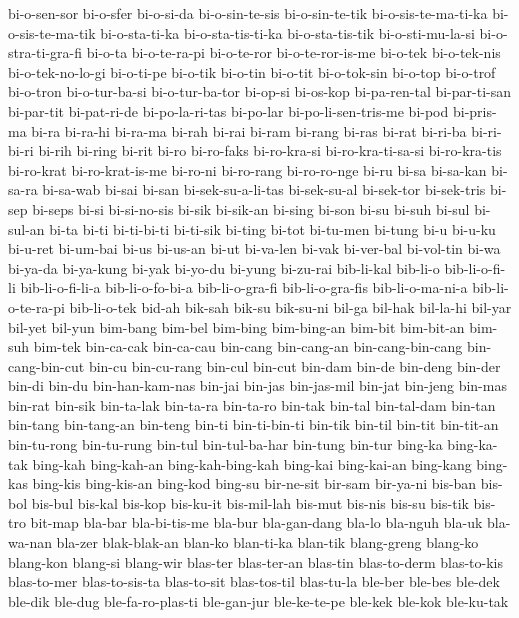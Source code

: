 {bi-o-sen-sor bi-o-sfer bi-o-si-da bi-o-sin-te-sis bi-o-sin-te-tik
bi-o-sis-te-ma-ti-ka bi-o-sis-te-ma-tik bi-o-sta-ti-ka bi-o-sta-tis-ti-ka
bi-o-sta-tis-tik bi-o-sti-mu-la-si bi-o-stra-ti-gra-fi bi-o-ta
bi-o-te-ra-pi bi-o-te-ror bi-o-te-ror-is-me bi-o-tek bi-o-tek-nis
bi-o-tek-no-lo-gi bi-o-ti-pe bi-o-tik bi-o-tin bi-o-tit bi-o-tok-sin
bi-o-top bi-o-trof bi-o-tron bi-o-tur-ba-si bi-o-tur-ba-tor bi-op-si
bi-os-kop bi-pa-ren-tal bi-par-ti-san bi-par-tit bi-pat-ri-de
bi-po-la-ri-tas bi-po-lar bi-po-li-sen-tris-me bi-pod bi-pris-ma bi-ra
bi-ra-hi bi-ra-ma bi-rah bi-rai bi-ram bi-rang bi-ras bi-rat bi-ri-ba
bi-ri-bi-ri bi-rih bi-ring bi-rit bi-ro bi-ro-faks bi-ro-kra-si
bi-ro-kra-ti-sa-si bi-ro-kra-tis bi-ro-krat bi-ro-krat-is-me bi-ro-ni
bi-ro-rang bi-ro-ro-nge bi-ru bi-sa bi-sa-kan bi-sa-ra bi-sa-wab bi-sai
bi-san bi-sek-su-a-li-tas bi-sek-su-al bi-sek-tor bi-sek-tris bi-sep
bi-seps bi-si bi-si-no-sis bi-sik bi-sik-an bi-sing bi-son bi-su bi-suh
bi-sul bi-sul-an bi-ta bi-ti bi-ti-bi-ti bi-ti-sik bi-ting bi-tot
bi-tu-men bi-tung bi-u bi-u-ku bi-u-ret bi-um-bai bi-us bi-us-an bi-ut
bi-va-len bi-vak bi-ver-bal bi-vol-tin bi-wa bi-ya-da bi-ya-kung bi-yak
bi-yo-du bi-yung bi-zu-rai bib-li-kal bib-li-o bib-li-o-fi-li
bib-li-o-fi-li-a bib-li-o-fo-bi-a bib-li-o-gra-fi bib-li-o-gra-fis
bib-li-o-ma-ni-a bib-li-o-te-ra-pi bib-li-o-tek bid-ah bik-sah bik-su
bik-su-ni bil-ga bil-hak bil-la-hi bil-yar bil-yet bil-yun bim-bang
bim-bel bim-bing bim-bing-an bim-bit bim-bit-an bim-suh bim-tek bin-ca-cak
bin-ca-cau bin-cang bin-cang-an bin-cang-bin-cang bin-cang-bin-cut bin-cu
bin-cu-rang bin-cul bin-cut bin-dam bin-de bin-deng bin-der bin-di bin-du
bin-han-kam-nas bin-jai bin-jas bin-jas-mil bin-jat bin-jeng bin-mas
bin-rat bin-sik bin-ta-lak bin-ta-ra bin-ta-ro bin-tak bin-tal bin-tal-dam
bin-tan bin-tang bin-tang-an bin-teng bin-ti bin-ti-bin-ti bin-tik bin-til
bin-tit bin-tit-an bin-tu-rong bin-tu-rung bin-tul bin-tul-ba-har bin-tung
bin-tur bing-ka bing-ka-tak bing-kah bing-kah-an bing-kah-bing-kah
bing-kai bing-kai-an bing-kang bing-kas bing-kis bing-kis-an bing-kod
bing-su bir-ne-sit bir-sam bir-ya-ni bis-ban bis-bol bis-bul bis-kal
bis-kop bis-ku-it bis-mil-lah bis-mut bis-nis bis-su bis-tik bis-tro
bit-map bla-bar bla-bi-tis-me bla-bur bla-gan-dang bla-lo bla-nguh bla-uk
bla-wa-nan bla-zer blak-blak-an blan-ko blan-ti-ka blan-tik blang-greng
blang-ko blang-kon blang-si blang-wir blas-ter blas-ter-an blas-tin
blas-to-derm blas-to-kis blas-to-mer blas-to-sis-ta blas-to-sit
blas-tos-til blas-tu-la ble-ber ble-bes ble-dek ble-dik ble-dug
ble-fa-ro-plas-ti ble-gan-jur ble-ke-te-pe ble-kek ble-kok ble-ku-tak
}
